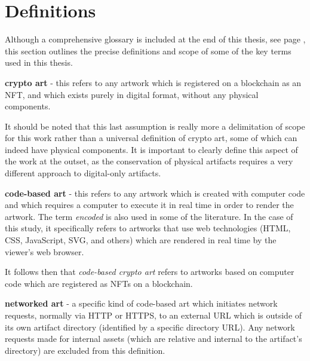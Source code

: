 \section{Definitions}
\label{sec:definitions}

Although a comprehensive glossary is included at the end of this thesis, see page \pageref{sec:glossary}, this section outlines the precise definitions and scope of some of the key terms used in this thesis.

\vspace{0.5cm}

\textbf{crypto art} - this refers to any artwork which is registered on a blockchain as an NFT, and which exists purely in digital format, without any physical components.

\vspace{0.5cm}

It should be noted that this last assumption is really more a delimitation of scope for this work rather than a universal definition of crypto art, some of which can indeed have physical components. It is important to clearly define this aspect of the work at the outset, as the conservation of physical artifacts requires a very different approach to digital-only artifacts.

\vspace{0.5cm}

\textbf{code-based art} - this refers to any artwork which is created with computer code and which requires a computer to execute it in real time in order to render the artwork. The term \emph{encoded} is also used in some of the literature. In the case of this study, it specifically refers to artworks that use web technologies (HTML, CSS, JavaScript, SVG, and others) which are rendered in real time by the viewer's web browser.

\vspace{0.5cm}

It follows then that \emph{code-based crypto art} refers to artworks based on computer code which are registered as NFTs on a blockchain.

\vspace{0.5cm}

\textbf{networked art} - a specific kind of code-based art which initiates network requests, normally via HTTP or HTTPS, to an external URL which is outside of its own artifact directory (identified by a specific directory URL). Any network requests made for internal assets (which are relative and internal to the artifact's directory) are excluded from this definition.

